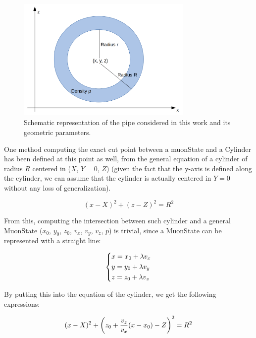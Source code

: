\documentclass[a4paper, 11pt, twoside, openright]{report}
\begin{document}
\begin{figure}[htbp]
\centering
\begin{minipage}[b]{.49\textwidth}
\includegraphics[width=8.5cm, height=6cm]{figs/cylinder.png}
\end{minipage}\hfill
\caption{Schematic representation of the pipe considered in this work and its geometric parameters.}
\label{fig:cylinder}
\end{figure}

One method computing the exact cut point between a muonState and a Cylinder has been defined at this point as well, from the general equation of a cylinder of radius $R$ centered in ($X$, $Y = 0$, $Z$) (given the fact that the y-axis is defined along the cylinder, we can assume that the cylinder is actually centered in $Y = 0$ without any loss of generalization).

\begin{equation}
\label{eq:cylinder}
(x - X)^2 + (z - Z)^2 = R^2
\end{equation}

From this, computing the intersection between such cylinder and a general MuonState ($x_0$, $y_0$, $z_0$, $v_{x}$, $v_{y}$, $v_{z}$, $p$) is trivial, since a MuonState can be represented with a straight line: 

\begin{equation}
\label{eq:line}
\begin{dcases}
x = x_0 + \lambda v_x \\
y = y_0 + \lambda v_y \\
z = z_0 + \lambda v_z
\end{dcases}
\end{equation}

By putting this into the equation of the cylinder, we get the following expressions:

\begin{equation}
\label{eq:together}
(x - X)^2 + \left (z_0 + \frac{v_z}{v_x} (x - x_0) - Z \right )^2 = R^2 \\
\end{equation}
\end{document}
